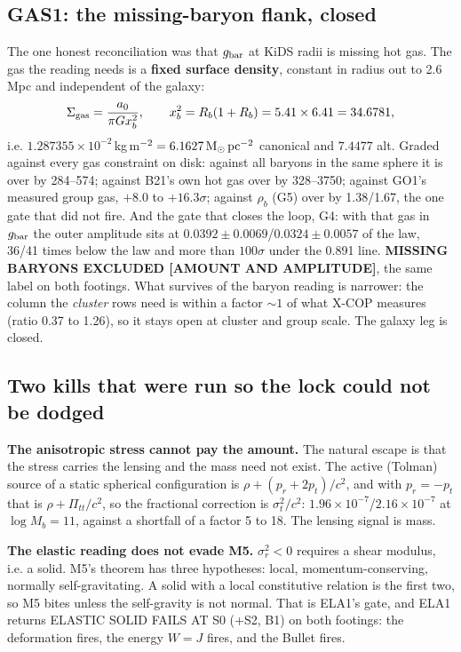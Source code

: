 \documentclass[10pt]{article}
\newcommand{\Msun}{\mathrm{M}_\odot}
\begin{document}
\subsection{GAS1: the missing-baryon flank, closed}
The one honest reconciliation was that $g_{\rm bar}$ at KiDS radii is missing hot gas. The gas the reading needs
is a {\bf fixed surface density}, constant in radius out to 2.6\,Mpc and independent of the galaxy:
\[
  \Sigma_{\rm gas}=\frac{a_0}{\pi G x_b^{2}},\qquad x_b^{2}=R_b(1+R_b)=5.41\times6.41=34.6781,
\]
i.e. $1.287355\times10^{-2}$\,kg\,m$^{-2}=6.1627\,\Msun\,{\rm pc}^{-2}$ canonical and $7.4477$ alt. Graded
against every gas constraint on disk: against all baryons in the same sphere it is over by 284--574; against
B21's own hot gas over by 328--3750; against GO1's measured group gas, $+8.0$ to $+16.3\sigma$; against
$\rho_b$ (G5) over by 1.38/1.67, the one gate that did not fire. And the gate that closes the loop, G4: with
that gas in $g_{\rm bar}$ the outer amplitude sits at $0.0392\pm0.0069$/$0.0324\pm0.0057$ of the law, 36/41 times
below the law and more than $100\sigma$ under the 0.891 line. {\bf MISSING BARYONS EXCLUDED [AMOUNT AND
AMPLITUDE]}, the same label on both footings. What survives of the baryon reading is narrower: the column the
{\it cluster} rows need is within a factor $\sim1$ of what X-COP measures (ratio 0.37 to 1.26), so it stays open
at cluster and group scale. The galaxy leg is closed.

\subsection{Two kills that were run so the lock could not be dodged}
{\bf The anisotropic stress cannot pay the amount.} The natural escape is that the stress carries the lensing
and the mass need not exist. The active (Tolman) source of a static spherical configuration is
$\rho+(p_r+2p_t)/c^2$, and with $p_r=-p_t$ that is $\rho+\Pi_{tt}/c^2$, so the fractional correction is
$\sigma_t^2/c^2$: $1.96\times10^{-7}$/$2.16\times10^{-7}$ at $\log M_b=11$, against a shortfall of a factor 5 to
18. The lensing signal is mass.

{\bf The elastic reading does not evade M5.} $\sigma_r^2<0$ requires a shear modulus, i.e. a solid. M5's
theorem has three hypotheses: local, momentum-conserving, normally self-gravitating. A solid with a local
constitutive relation is the first two, so M5 bites unless the self-gravity is not normal. That is ELA1's gate,
and ELA1 returns ELASTIC SOLID FAILS AT S0 (+S2, B1) on both footings: the deformation fires, the energy
$W=J$ fires, and the Bullet fires.
\end{document}
